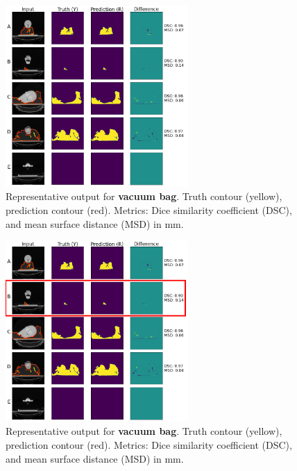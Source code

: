 \documentclass[9pt]{beamer}
\begin{document}
  \begin{frame}{}
\begin{figure}
\includegraphics[width=0.62\textwidth]{images/vet_vacbag}
\caption{Representative output for \textbf{vacuum bag}. Truth contour (yellow),
  prediction contour (red). Metrics: Dice similarity coefficient (DSC), and mean
  surface distance (MSD) in mm.}
\end{figure}
\end{frame}


\begin{frame}{}
  \begin{figure}
    \includegraphics[width=0.62\textwidth]{images/vet_vacbag_worst}
    \caption{Representative output for \textbf{vacuum bag}. Truth contour (yellow),
      prediction contour (red). Metrics: Dice similarity coefficient (DSC), and mean
      surface distance (MSD) in mm.}
  \end{figure}
\end{frame}
%
\end{document}
